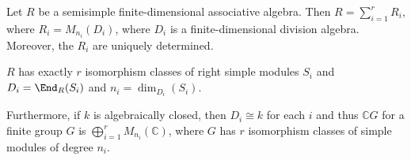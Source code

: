Let $R$ be a semisimple finite-dimensional associative algebra. Then
$R = \sum_{i = 1}^r R_i$, where $R_i = M_{n_i}(D_i)$, where $D_i$ is a
finite-dimensional division algebra. Moreover, the $R_i$ are uniquely determined.

$R$ has exactly $r$ isomorphism classes of right simple modules $S_i$ and
$D_i = \End_R(S_i)$ and $n_i = \dim_{D_i}(S_i)$.

Furthermore, if $k$ is algebraically closed, then $D_i \cong k$ for each $i$ and
thus $\mathbb{C}G$ for a finite group $G$ is $\bigoplus_{i=1}^r M_{n_i}(\mathbb{C})$,
where $G$ has $r$ isomorphism classes of simple modules of degree $n_i$.
